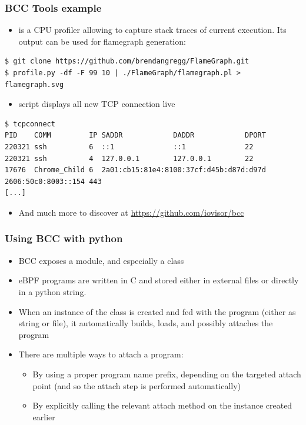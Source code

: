 \begin{frame}[fragile]
  \frametitle{BCC Tools example}
  \begin{itemize}
    \item {} is a CPU profiler allowing to capture stack traces of
          current execution. Its output can be used for flamegraph generation:
  \end{itemize}
  \begin{block}{}
    \begin{verbatim}
$ git clone https://github.com/brendangregg/FlameGraph.git
$ profile.py -df -F 99 10 | ./FlameGraph/flamegraph.pl > flamegraph.svg
    \end{verbatim}
  \end{block}
  \begin{itemize}
    \item {} script displays all new TCP connection live
  \end{itemize}
  \begin{block}{}
    \begin{verbatim}
$ tcpconnect
PID    COMM         IP SADDR            DADDR            DPORT
220321 ssh          6  ::1              ::1              22   
220321 ssh          4  127.0.0.1        127.0.0.1        22   
17676  Chrome_Child 6  2a01:cb15:81e4:8100:37cf:d45b:d87d:d97d 2606:50c0:8003::154 443  
[...]
    \end{verbatim}
  \end{block}
  \begin{itemize}
    \item And much more to discover at \url{https://github.com/iovisor/bcc}
  \end{itemize}
\end{frame}

\begin{frame}[fragile]
  \frametitle{Using BCC with python}
  \begin{itemize}
    \item BCC exposes a  module, and especially a  class
    \item eBPF programs are written in C and stored either in external files
    or directly in a python string.
    \item When an instance of the  class is created and fed with the
    program (either as string or file), it automatically builds, loads, and
    possibly attaches the program
    \item There are multiple ways to attach a program:
    \begin{itemize}
      \item By using a proper program name prefix, depending on the targeted
      attach point (and so the attach step is performed automatically)
      \item By explicitly calling the relevant attach method on the 
      instance created earlier
    \end{itemize}
  \end{itemize}
\end{frame}

